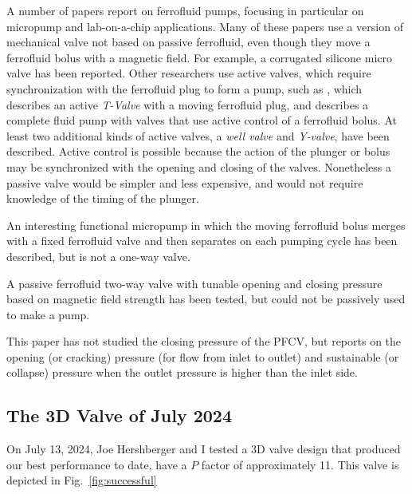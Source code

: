 \documentclass{asme2ej}
\begin{document}
A number of papers report on ferrofluid pumps, focusing in particular
on micropump and lab-on-a-chip applications\cite{ozbey2015modeling,hsu2018biocompatible}.
Many of these papers use
a version of mechanical valve not based on passive
ferrofluid, even though they move a ferrofluid bolus
with a magnetic field.
For example,
a corrugated silicone micro valve\cite{yamahata2003ferrofluid,yamahata2005plastic}
has been reported.
Other researchers use active valves, which require synchronization with
the ferrofluid plug to form a pump,
such as \cite{menz2000fluidic}, which
describes an active {\em T-Valve} with a moving ferrofluid plug, and
\cite{ando2009ferrofluidic} describes a complete fluid pump with valves
that use
active control of a ferrofluid bolus.
At least two additional kinds of active valves, a {\em well valve} and
{\em Y-valve}, have
been described\cite{hartshorne2004ferrofluid}.
Active control is possible because the
action of the plunger or bolus may be synchronized with the opening and closing
of the valves.
Nonetheless a passive valve would be simpler and less
expensive, and would not require knowledge of the timing of the
plunger.

An interesting functional micropump in which the
moving ferrofluid bolus merges with a fixed ferrofluid valve and then
separates on each pumping cycle has been described\cite{hatch2001ferrofluidic},
but is not a one-way valve.

A passive ferrofluid two-way valve with tunable
opening and closing pressure based on magnetic
field strength\cite{paschalis2013novel} has been tested,
but could not be passively used to make a pump.

This paper has not studied the closing pressure of the PFCV, but reports on
the opening (or cracking) pressure (for flow from inlet to outlet) and
sustainable (or collapse) pressure
when the outlet pressure is higher than the inlet side.

\subsection{The 3D Valve of July 2024}

On July 13, 2024, Joe Hershberger and I tested a 3D valve design that produced our
best performance to date, have a $P$ factor of approximately 11.
This valve is depicted in Fig.~\ref{fig:successful}
\end{document}
